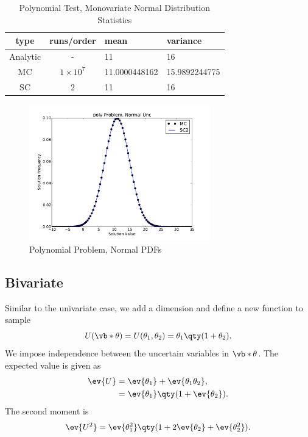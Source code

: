 \begin{table}[H]
\begin{center}
\begin{tabular}{c c|l l}
type & runs/order & mean & variance \\ \hline
Analytic & - & 11 & 16 \\
MC & $1\times10^7$ & 11.0000448162 & 15.9892244775 \\
SC & 2 & 11 & 16 \\
\end{tabular}
\end{center}
\caption{Polynomial Test, Monovariate Normal Distribution Statistics}
\label{tab:poly normal}
\end{table}

\begin{figure}[H]
\centering
   \includegraphics[width=0.7\textwidth]{../graphics/poly_normal_pdfs}
   \caption{Polynomial Problem, Normal PDFs}
      \label{fig:poly norm}
\end{figure}



\subsection{Bivariate}
Similar to the univariate case, we add a dimension and define a new function to sample
\begin{equation}
U(\vb*{\theta})=U(\theta_1,\theta_2)=\theta_1\qty(1+\theta_2).
\end{equation}
We impose independence between the uncertain variables in $\vb*{\theta}$.
The expected value is given as
\begin{align}
\ev{U}&=\ev{\theta_1}+\ev{\theta_1\theta_2},\\
  &= \ev{\theta_1}\qty(1+\ev{\theta_2}).
\end{align}
The second moment is
\begin{align}
\ev{U^2}=\ev{\theta_1^2}\qty(1+2\ev{\theta_2}+\ev{\theta_2^2}).
\end{align}

